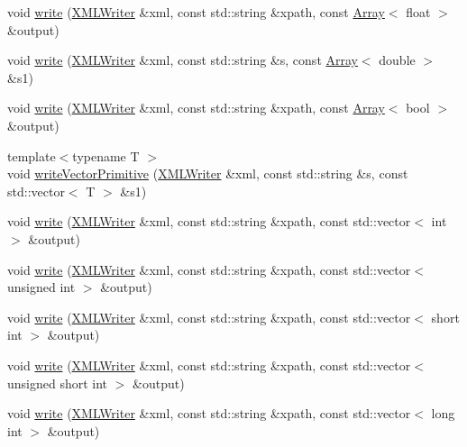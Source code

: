 \begin{DoxyCompactItemize}
void \mbox{\hyperlink{group__io_ga37bab6df89540c0999683cb373ad2d3d}{write}} (\mbox{\hyperlink{classADATXML_1_1XMLWriter}{X\+M\+L\+Writer}} \&xml, const std\+::string \&xpath, const \mbox{\hyperlink{classXMLArray_1_1Array}{Array}}$<$ float $>$ \&output)
\item 
void \mbox{\hyperlink{group__io_ga82a292d577216b66e12c9876c7fe7a10}{write}} (\mbox{\hyperlink{classADATXML_1_1XMLWriter}{X\+M\+L\+Writer}} \&xml, const std\+::string \&s, const \mbox{\hyperlink{classXMLArray_1_1Array}{Array}}$<$ double $>$ \&s1)
\item 
void \mbox{\hyperlink{group__io_ga9a93f3084bfa9501e5fb5da53925c25d}{write}} (\mbox{\hyperlink{classADATXML_1_1XMLWriter}{X\+M\+L\+Writer}} \&xml, const std\+::string \&xpath, const \mbox{\hyperlink{classXMLArray_1_1Array}{Array}}$<$ bool $>$ \&output)
\item 
{\footnotesize template$<$typename T $>$ }\\void \mbox{\hyperlink{namespaceADATXML_ac69d6dbd4a4a3ca366df448dfc85c9d2}{write\+Vector\+Primitive}} (\mbox{\hyperlink{classADATXML_1_1XMLWriter}{X\+M\+L\+Writer}} \&xml, const std\+::string \&s, const std\+::vector$<$ T $>$ \&s1)
\item 
void \mbox{\hyperlink{group__io_ga5f73c76144fce7c12dd53d0f785b2d05}{write}} (\mbox{\hyperlink{classADATXML_1_1XMLWriter}{X\+M\+L\+Writer}} \&xml, const std\+::string \&xpath, const std\+::vector$<$ int $>$ \&output)
\item 
void \mbox{\hyperlink{group__io_ga763106f559ef609d54f89243e5965af4}{write}} (\mbox{\hyperlink{classADATXML_1_1XMLWriter}{X\+M\+L\+Writer}} \&xml, const std\+::string \&xpath, const std\+::vector$<$ unsigned int $>$ \&output)
\item 
void \mbox{\hyperlink{group__io_ga9085d80500322f8f56b37df7c27cd61a}{write}} (\mbox{\hyperlink{classADATXML_1_1XMLWriter}{X\+M\+L\+Writer}} \&xml, const std\+::string \&xpath, const std\+::vector$<$ short int $>$ \&output)
\item 
void \mbox{\hyperlink{group__io_gad9f57f8c23abf2a400ef501bb816e173}{write}} (\mbox{\hyperlink{classADATXML_1_1XMLWriter}{X\+M\+L\+Writer}} \&xml, const std\+::string \&xpath, const std\+::vector$<$ unsigned short int $>$ \&output)
\item 
void \mbox{\hyperlink{group__io_ga402db05a61329b7bfeb8e92021f669c6}{write}} (\mbox{\hyperlink{classADATXML_1_1XMLWriter}{X\+M\+L\+Writer}} \&xml, const std\+::string \&xpath, const std\+::vector$<$ long int $>$ \&output)
\item 

\end{DoxyCompactItemize}
